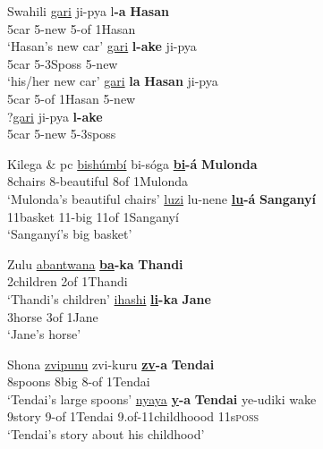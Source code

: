 \documentclass[output=paper
,modfonts
,nonflat]{langsci/langscibook}
\begin{document}
\begin{exe}
		\ex Swahili \citep[100]{Carstens1991}
		\xlist
		\ex 
		\gll \underline{gari}     ji-pya     l\textbf{-a}     \textbf{Hasan}\\
		5car   5-new     5-of    1Hasan\\
		\glt `Hasan's new car'  	
		\ex 
		\gll \underline{gari}     \textbf{l{}-ake}    ji-pya\\
		5car  5-3Sposs  5-new\\
		\glt `his/her new car'
		\ex
		\gll  *\underline{gari}  \textbf{la}     \textbf{Hasan}      ji-pya\\
		5car 5-of   1Hasan   5-new\\
		\ex
		\gll  ?\underline{gari}   ji-pya   \textbf{l{}-ake}\\
		5car   5-new   5-3\textsc{s}poss\\
		\endxlist
\end{exe}
\begin{exe}
	\ex Kilega \citep{Kinyalolo1991} \& pc
	\xlist
	\ex 
	\gll \underline{bishúmbí}   bi-sóga        \textbf{\underline{bi}-á}   \textbf{Mulonda} \\
	8chairs       8-beautiful     8of    1Mulonda\\
	\glt `Mulonda’s beautiful chairs'  	
	\ex 
	\gll \underline{luzi}               lu-nene   \textbf{\underline{lu}-á}    \textbf{Sanganyí}\\
	11basket   11-big    11of      1Sanganyí\\
	\glt `Sanganyí’s big basket'
	\endxlist
\end{exe}
\begin{exe}
	\ex Zulu
	\xlist
	\ex 
	\gll \underline{abantwana} \textbf{\underline{ba}{}-ka}   \textbf{Thandi} \\
	2children     2of        1Thandi\\
	\glt `Thandi’s children'  	
	\ex 
	\gll \underline{ihashi}   \textbf{\underline{li}{}-ka}  \textbf{Jane}\\
	3horse 3of     1Jane\\
	\glt `Jane’s horse'
	\endxlist
\end{exe}
\begin{exe}
	\ex Shona
	\xlist
	\ex 
	\gll \underline{zvipunu}   zvi-kuru \textbf{\underline{zv}{}-a}     \textbf{Tendai} \\
	8spoons   8big       8-of    1Tendai\\
	\glt `Tendai’s large spoons'  	
	\ex 
	\gll \underline{nyaya}   \textbf{\underline{y}{}-a}     \textbf{Tendai}   ye-udiki             wake\\
	9story   9-of    1Tendai   9.of-11childhoood     11s\textsc{poss}\\
	\glt `Tendai's story about his childhood'
	\endxlist
\end{exe}
\end{document}
